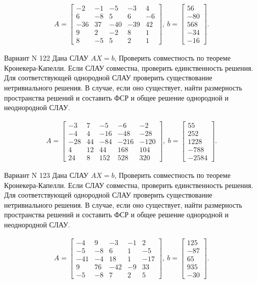 \documentclass[11pt]{report}
\begin{document}
\begin{align*}
 A = \left[\begin{matrix}-2 & -1 & -5 & -3 & 4\\6 & -8 & 5 & 6 & -6\\-36 & 37 & -40 & -39 & 42\\9 & 2 & -2 & 8 & 1\\8 & -5 & 5 & 2 & 1\end{matrix}\right],
\ b = \left[\begin{matrix}56\\-80\\568\\-34\\-16\end{matrix}\right]. 
 \end{align*}

Вариант N 122
Дана СЛАУ $AX = b$,
Проверить совместность по теореме Кронекера-Капелли. Если СЛАУ совместна, проверить единственность решения.
Для соответствующей однородной СЛАУ проверить существование нетривиального решения. В случае, если оно существует,
найти размерность пространства решений и составить ФСР и общее решение однородной  и неоднородной СЛАУ.


\begin{align*}
 A = \left[\begin{matrix}-3 & 7 & -5 & -6 & -2\\-4 & 4 & -16 & -48 & -28\\-28 & 44 & -84 & -216 & -120\\4 & 12 & 44 & 168 & 104\\24 & 8 & 152 & 528 & 320\end{matrix}\right],
\ b = \left[\begin{matrix}55\\252\\1228\\-788\\-2584\end{matrix}\right]. 
 \end{align*}

Вариант N 123
Дана СЛАУ $AX = b$,
Проверить совместность по теореме Кронекера-Капелли. Если СЛАУ совместна, проверить единственность решения.
Для соответствующей однородной СЛАУ проверить существование нетривиального решения. В случае, если оно существует,
найти размерность пространства решений и составить ФСР и общее решение однородной  и неоднородной СЛАУ.


\begin{align*}
 A = \left[\begin{matrix}-4 & 9 & -3 & -1 & 2\\-5 & -8 & 6 & 1 & -5\\-41 & -4 & 18 & 1 & -17\\9 & 76 & -42 & -9 & 33\\-5 & -8 & 7 & 2 & 5\end{matrix}\right],
\ b = \left[\begin{matrix}125\\-87\\65\\935\\-30\end{matrix}\right]. 
 \end{align*}
\end{document}
